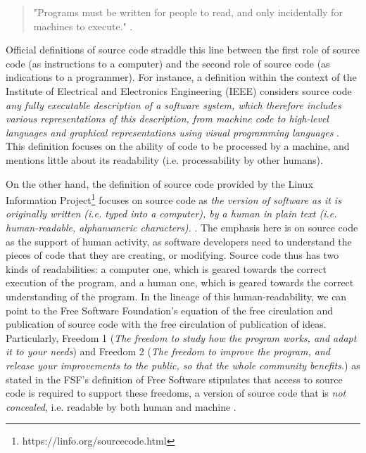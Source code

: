 \begin{quotation}
    "Programs must be written for people to read, and only incidentally for machines to execute." \citep{abelson_structure_1979}.    
\end{quotation}


Official definitions of source code straddle this line between the first role of source code (as instructions to a computer) and the second role of source code (as indications to a programmer). For instance, a definition within the context of the Institute of Electrical and Electronics Engineering (IEEE) considers source code \emph{any fully executable description of a software system, which therefore includes various representations of this description, from machine code to high-level languages and graphical representations using visual programming languages} \citep{harman_why_2010}. This definition focuses on the ability of code to be processed by a machine, and mentions little about its readability (i.e. processability by other humans).

On the other hand, the definition of source code provided by the Linux Information Project\footnote{https://linfo.org/sourcecode.html} focuses on source code as \emph{the version of software as it is originally written (i.e. typed into a computer), by a human in plain text (i.e. human-readable, alphanumeric characters).} \citep{linuxinformationproject_source_2004}. The emphasis here is on source code as the support of human activity, as software developers need to understand the pieces of code that they are creating, or modifying. Source code thus has two kinds of readabilities: a computer one, which is geared towards the correct execution of the program, and a human one, which is geared towards the correct understanding of the program. In the lineage of this human-readability, we can point to the Free Software Foundation's equation of the free circulation and publication of source code with the free circulation of publication of ideas. Particularly, Freedom 1 (\emph{The freedom to study how the program works, and adapt it to your needs}) and Freedom 2 (\emph{The freedom to improve the program, and release your improvements to the public, so that the whole community benefits.}) as stated in the FSF's definition of Free Software stipulates that access to source code is required to support these freedoms, a version of source code that is \emph{not concealed}, i.e. readable by both human and machine \citep{stallman_free_2002}.


